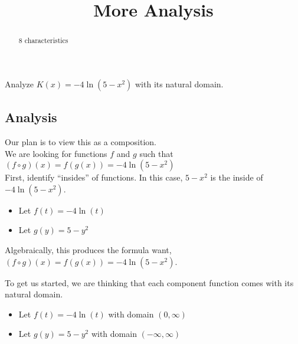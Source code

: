 \documentclass{ximera}
\title{More Analysis}
\begin{document}
\begin{abstract}
8 characteristics
\end{abstract}
\maketitle












Analyze $K(x) = -4 \ln(5 - x^2)$ with its natural domain. \\




\subsection*{Analysis}





Our plan is to view this as a composition. \\






We are looking for functions $f$ and $g$ such that $(f \circ g)(x) = f(g(x)) = -4 \ln(5 - x^2)$ \\


First, identify ``insides'' of functions.  In this case, $5 - x^2$ is the inside of $-4 \ln(5 - x^2)$. \\



\begin{itemize}
\item Let $f(t) = -4 \ln(t)$ \\
\item Let $g(y) = 5 - y^2$ \\
\end{itemize}

Algebraically, this produces the formula want, $(f \circ g)(x) = f(g(x)) = -4 \ln(5 - x^2)$.


To get us started, we are thinking that each component function comes with its natural domain.

\begin{itemize}
\item Let $f(t) = -4 \ln(t)$ with domain $(0, \infty)$ \\
\item Let $g(y) = 5 - y^2$ with domain $(-\infty, \infty)$ \\
\end{itemize}
\end{document}
